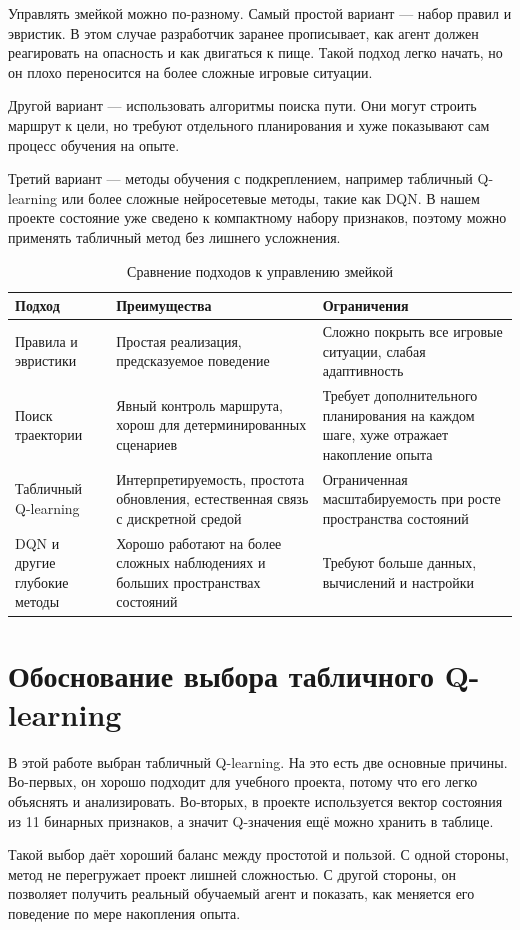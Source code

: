 Управлять змейкой можно по-разному. Самый простой вариант --- набор правил и эвристик. В этом случае разработчик заранее прописывает, как агент должен реагировать на опасность и как двигаться к пище. Такой подход легко начать, но он плохо переносится на более сложные игровые ситуации.

Другой вариант --- использовать алгоритмы поиска пути. Они могут строить маршрут к цели, но требуют отдельного планирования и хуже показывают сам процесс обучения на опыте.

Третий вариант --- методы обучения с подкреплением, например табличный Q-learning или более сложные нейросетевые методы, такие как DQN. В нашем проекте состояние уже сведено к компактному набору признаков, поэтому можно применять табличный метод без лишнего усложнения.

\begin{table}[H]
    \centering
    \caption{Сравнение подходов к управлению змейкой}
    \begin{tabularx}{\textwidth}{>{\raggedright\arraybackslash}p{} >{\raggedright\arraybackslash}p{} X}
        \toprule
        Подход & Преимущества & Ограничения \\
        \midrule
        Правила и эвристики & Простая реализация, предсказуемое поведение & Сложно покрыть все игровые ситуации, слабая адаптивность \\
        Поиск траектории & Явный контроль маршрута, хорош для детерминированных сценариев & Требует дополнительного планирования на каждом шаге, хуже отражает накопление опыта \\
        Табличный Q-learning & Интерпретируемость, простота обновления, естественная связь с дискретной средой & Ограниченная масштабируемость при росте пространства состояний \\
        DQN и другие глубокие методы & Хорошо работают на более сложных наблюдениях и больших пространствах состояний & Требуют больше данных, вычислений и настройки \\
        \bottomrule
    \end{tabularx}
\end{table}

\section{Обоснование выбора табличного Q-learning}

В этой работе выбран табличный Q-learning. На это есть две основные причины. Во-первых, он хорошо подходит для учебного проекта, потому что его легко объяснять и анализировать. Во-вторых, в проекте используется вектор состояния из 11 бинарных признаков, а значит Q-значения ещё можно хранить в таблице.

Такой выбор даёт хороший баланс между простотой и пользой. С одной стороны, метод не перегружает проект лишней сложностью. С другой стороны, он позволяет получить реальный обучаемый агент и показать, как меняется его поведение по мере накопления опыта.
